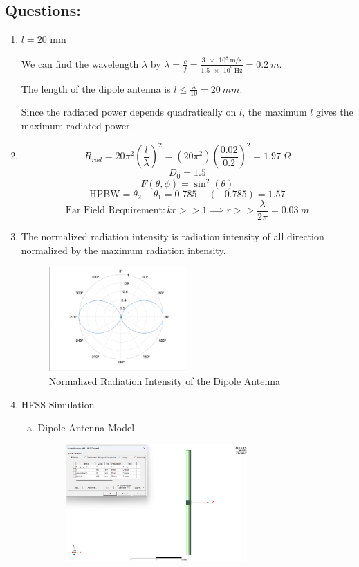 \documentclass{article} %
\begin{document}
\subsection*{Questions:}
\begin{enumerate}
    \item $l = 20$ mm

          We can find the wavelength $\lambda$ by $\lambda = \frac{c}{f} = \frac{\SI{3e8}{\meter\per\second}}{\SI{1.5e9}{\hertz}} = \SI{0.2}{m}$.

          The length of the dipole antenna is $l \leq  \frac{\lambda}{10} = \SI{20}{mm}$.

          Since the radiated power depends quadratically on $l$, the maximum $l$ gives the maximum radiated power.
    \item
          $$R_{rad} = 20 \pi^2 \left(\frac{l}{\lambda}\right)^2 = (20 \pi^2)\left(\frac{0.02}{0.2}\right)^2 = \SI{1.97}{\Omega}$$
          $$D_0 = 1.5$$
          $$F(\theta, \phi) = \sin^2(\theta)$$
          $$\text{HPBW} = \theta_2 - \theta_1 = 0.785-(-0.785) = 1.57$$
          $$\text{Far Field Requirement}: kr >> 1 \implies r >> \frac{\lambda}{2\pi} = \SI{0.03}{m}$$
    \item The normalized radiation intensity is radiation intensity of all direction normalized by the maximum radiation intensity.
          \begin{figure}[H]
              \centering
              \includegraphics[width=0.5\textwidth]{./image/figure1.png}
              \caption{Normalized Radiation Intensity of the Dipole Antenna}
          \end{figure}
    \item HFSS Simulation
          \begin{enumerate}[(a)]
              \item Dipole Antenna Model
                    \begin{figure}[H]
                        \centering
                        \includegraphics[width=0.7\textwidth]{./image/figure2.png}

\end{figure}
\end{enumerate}
\end{enumerate}
\end{document}
